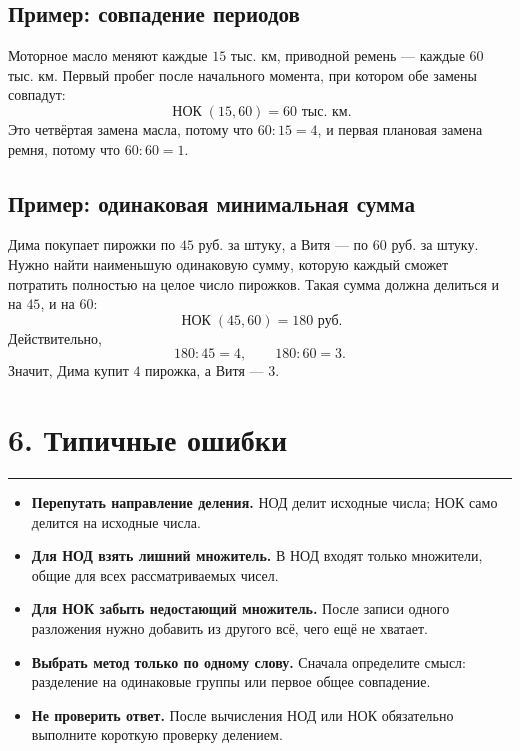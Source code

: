 \documentclass[a4paper,12pt]{article}
\newcommand{\nokru}{\mathop{\text{НОК}}\nolimits}
\newcommand{\sectionline}{%
  \vspace{-0.2em}\par\noindent
  {\color{accent}\rule{\linewidth}{0.55pt}}%
  \vspace{0.35em}
}
\begin{document}
\subsection*{Пример: совпадение периодов}

Моторное масло меняют каждые \(15\) тыс. км, приводной ремень --- каждые \(60\) тыс. км.
Первый пробег после начального момента, при котором обе замены совпадут:
\[
\nokru(15,60)=60\text{ тыс. км}.
\]
Это четвёртая замена масла, потому что \(60:15=4\), и первая плановая замена ремня, потому что \(60:60=1\).

\subsection*{Пример: одинаковая минимальная сумма}

Дима покупает пирожки по \(45\) руб. за штуку, а Витя --- по \(60\) руб. за штуку.
Нужно найти наименьшую одинаковую сумму, которую каждый сможет потратить полностью на целое число пирожков.
Такая сумма должна делиться и на \(45\), и на \(60\):
\[
\nokru(45,60)=180\text{ руб.}
\]
Действительно,
\[
180:45=4,
\qquad
180:60=3.
\]
Значит, Дима купит \(4\) пирожка, а Витя --- \(3\).

\section*{6. Типичные ошибки}
\sectionline

\begin{itemize}[leftmargin=7mm,itemsep=3pt,topsep=2pt]
\item \textbf{Перепутать направление деления.} НОД делит исходные числа; НОК само делится на исходные числа.
\item \textbf{Для НОД взять лишний множитель.} В НОД входят только множители, общие для всех рассматриваемых чисел.
\item \textbf{Для НОК забыть недостающий множитель.} После записи одного разложения нужно добавить из другого всё, чего ещё не хватает.
\item \textbf{Выбрать метод только по одному слову.} Сначала определите смысл: разделение на одинаковые группы или первое общее совпадение.
\item \textbf{Не проверить ответ.} После вычисления НОД или НОК обязательно выполните короткую проверку делением.
\end{itemize}

\end{document}
